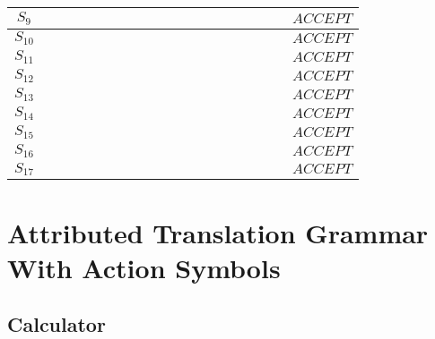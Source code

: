 \documentclass[a4paper,12pt]{article}
\begin{document}
\begin{landscape}
\begin{tabular}{|c|c|c|c|c|c|c|c|c|c|c|c|c|c|c|c|c|c|c|}
$S_{9}$	&				&				&				&				&				&				&				&				&				&				&				&				&				&				&				&				&				&	$ACCEPT$	\\
\hline                                                                           
$S_{10}$	&				&				&				&				&				&				&				&				&				&				&				&				&				&				&				&				&				&	$ACCEPT$	\\
\hline                                                                           
$S_{11}$	&				&				&				&				&				&				&				&				&				&				&				&				&				&				&				&				&				&	$ACCEPT$	\\
\hline                                                                           
$S_{12}$	&				&				&				&				&				&				&				&				&				&				&				&				&				&				&				&				&				&	$ACCEPT$	\\
\hline                                                                           
$S_{13}$	&				&				&				&				&				&				&				&				&				&				&				&				&				&				&				&				&				&	$ACCEPT$	\\
\hline                                                                           
$S_{14}$	&				&				&				&				&				&				&				&				&				&				&				&				&				&				&				&				&				&	$ACCEPT$	\\
\hline
$S_{15}$	&				&				&				&				&				&				&				&				&				&				&				&				&				&				&				&				&				&	$ACCEPT$	\\
\hline                                                                           
$S_{16}$	&				&				&				&				&				&				&				&				&				&				&				&				&				&				&				&				&				&	$ACCEPT$	\\
\hline                                                                           
$S_{17}$	&				&				&				&				&				&				&				&				&				&				&				&				&				&				&				&				&				&	$ACCEPT$	\\
\hline
\end{tabular}

\end{landscape}


\section{Attributed Translation Grammar With Action Symbols}

\subsection*{Calculator}
\end{document}
